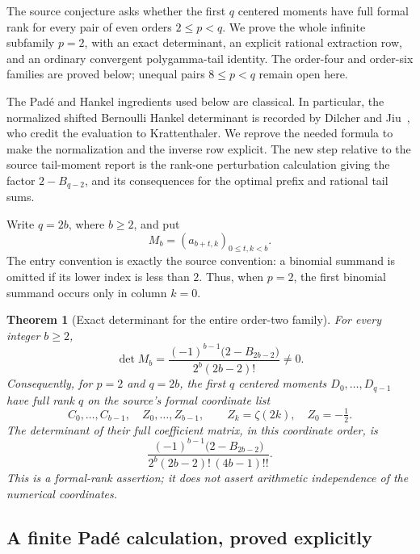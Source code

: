 \documentclass[11pt,a4paper]{article}
\numberwithin{equation}{section}
\theoremstyle{plain}
\newtheorem{theorem}{Theorem}[section]
\theoremstyle{definition}
\theoremstyle{remark}
\begin{document}
The source conjecture asks whether the first $q$ centered moments have
full formal rank for every pair of even orders $2\leq p<q$.
We prove the whole infinite subfamily $p=2$, with an exact determinant,
an explicit rational extraction row, and an ordinary convergent
polygamma-tail identity.  The order-four and order-six families are proved below; unequal pairs $8\leq p<q$
remain open here.

The Pad\'e and Hankel ingredients used below are classical.  In
particular, the normalized shifted Bernoulli Hankel determinant is
recorded by Dilcher and Jiu~\cite[\S7.3, Eq.~(7.12)]{DilcherJiu2020},
who credit the evaluation to Krattenthaler.  We reprove the needed
formula to make the normalization and the inverse row explicit.
The new step relative to the source tail-moment report is the
rank-one perturbation calculation giving the factor $2-B_{q-2}$,
and its consequences for the optimal prefix and rational tail sums.

Write $q=2b$, where $b\geq2$, and put
\[
 M_b=(a_{b+t,k})_{0\leq t,k<b}.
\]
The entry convention is exactly the source convention: a binomial
summand is omitted if its lower index is less than $2$.  Thus, when
$p=2$, the first binomial summand occurs only in column $k=0$.

\begin{theorem}[Exact determinant for the entire order-two family]
\label{thm:rank-two}
For every integer $b\geq2$,
\begin{equation}\label{eq:rank-two-det}
 \det M_b=
 \frac{(-1)^{b-1}\bigl(2-B_{2b-2}\bigr)}
 {2^b(2b-2)!}\ne0.
\end{equation}
Consequently, for $p=2$ and $q=2b$, the first $q$ centered moments
$D_0,\ldots,D_{q-1}$ have full rank $q$ on the source's formal
coordinate list
\[
 C_0,\ldots,C_{b-1},\quad Z_0,\ldots,Z_{b-1},
 \qquad Z_k=\zeta(2k),\quad Z_0=-\tfrac12.
\]
The determinant of their full coefficient matrix, in this coordinate
order, is
\begin{equation}\label{eq:rank-two-full-det}
 \frac{(-1)^{b-1}\bigl(2-B_{2b-2}\bigr)}
 {2^b(2b-2)!\,(4b-1)!!}.
\end{equation}
This is a formal-rank assertion; it does not assert arithmetic
independence of the numerical coordinates.
\end{theorem}

\subsection{A finite Pad\'e calculation, proved explicitly}
\end{document}
